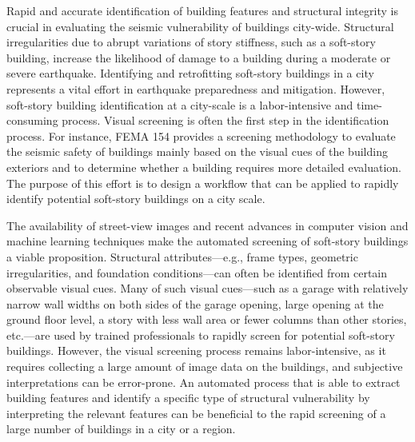Rapid and accurate identification of building features and structural integrity is crucial in evaluating the seismic vulnerability of buildings city-wide. Structural irregularities due to abrupt variations of story stiffness, such as a soft-story building, increase the likelihood of damage to a building during a moderate or severe earthquake. Identifying and retrofitting soft-story buildings in a city represents a vital effort in earthquake preparedness and mitigation. However, soft-story building identification at a city-scale is a labor-intensive and time-consuming process. Visual screening is often the first step in the identification process. For instance, FEMA 154 \citep{atc2015handbook} provides a screening methodology to evaluate the seismic safety of buildings mainly based on the visual cues of the building exteriors and to determine whether a building requires more detailed evaluation. The purpose of this effort is to design a workflow that can be applied to rapidly identify potential soft-story buildings on a city scale. 

The availability of street-view images and recent advances in computer vision and machine learning techniques make the automated screening of soft-story buildings a viable proposition. Structural attributes—e.g., frame types, geometric irregularities, and foundation conditions—can often be identified from certain observable visual cues. Many of such visual cues—such as a garage with relatively narrow wall widths on both sides of the garage opening, large opening at the ground floor level, a story with less wall area or fewer columns than other stories, etc.—are used by trained professionals to rapidly screen for potential soft-story buildings. However, the visual screening process remains labor-intensive, as it requires collecting a large amount of image data on the buildings, and subjective interpretations can be error-prone. An automated process that is able to extract building features and identify a specific type of structural vulnerability by interpreting the relevant features can be beneficial to the rapid screening of a large number of buildings in a city or a region. 


